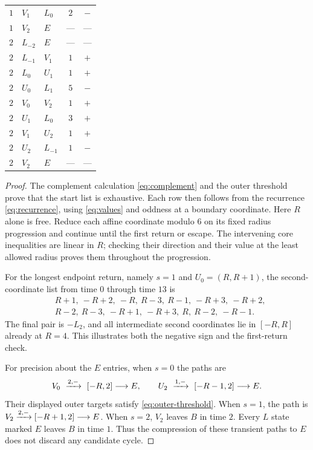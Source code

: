 {\begin{longtable}{cllcc}
$1$ & $V_1$ & $L_0$ & $2$ & $-$\\
$1$ & $V_2$ & $E$ & --- & ---\\
\midrule
$2$ & $L_{-2}$ & $E$ & --- & ---\\
$2$ & $L_{-1}$ & $V_1$ & $1$ & $+$\\
$2$ & $L_0$ & $U_1$ & $1$ & $+$\\
$2$ & $U_0$ & $L_1$ & $5$ & $-$\\
$2$ & $V_0$ & $V_2$ & $1$ & $+$\\
$2$ & $U_1$ & $L_0$ & $3$ & $+$\\
$2$ & $V_1$ & $U_2$ & $1$ & $+$\\
$2$ & $U_2$ & $L_{-1}$ & $1$ & $-$\\
$2$ & $V_2$ & $E$ & --- & ---\\
\end{longtable}
}

\begin{proof}
The complement calculation \eqref{eq:complement} and the outer
threshold prove that the start list is exhaustive. Each row then
follows from the recurrence \eqref{eq:recurrence}, using
\eqref{eq:values} and oddness at a boundary coordinate. Here $R$
alone is free. Reduce each affine coordinate modulo $6$ on its
fixed radius progression and continue until the first return or
escape. The intervening core inequalities are linear in $R$;
checking their direction and their value at the least allowed
radius proves them throughout the progression.

For the longest endpoint return, namely $s=1$ and
$U_0=(R,R+1)$, the second-coordinate list from time $0$ through
time $13$ is
\begin{align*}
 &R+1,\ -R+2,\ -R,\ R-3,\ R-1,\ -R+3,\ -R+2,\\
 &R-2,\ R-3,\ -R+1,\ -R+3,\ R,\ R-2,\ -R-1.
\end{align*}
The final pair is $-L_2$, and all intermediate second coordinates
lie in $[-R,R]$ already at $R=4$. This illustrates both the
negative sign and the first-return check.

For precision about the $E$ entries, when $s=0$ the paths are
\[
 V_0\ \xto{2,-}\ [-R,2]\longrightarrow E,\qquad
 U_2\ \xto{1,-}\ [-R-1,2]\longrightarrow E.
\]
Their displayed outer targets satisfy \eqref{eq:outer-threshold}.
When $s=1$, the path is
$V_2\xrightarrow{2,-}[-R+1,2]\longrightarrow E$.
When $s=2$, $V_2$ leaves $B$ in time $2$.
Every $L$ state marked $E$ leaves $B$ in time $1$.
Thus the compression of these transient paths to $E$ does not
discard any candidate cycle.
\end{proof}


